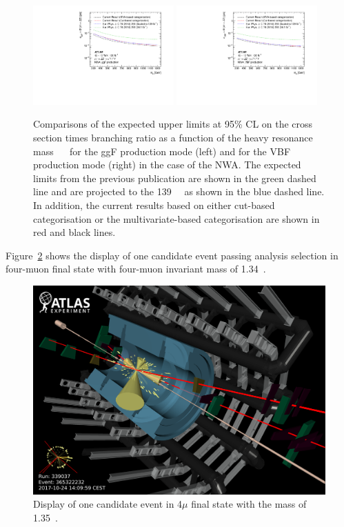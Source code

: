 \begin{figure}[h]
    \centering
    \includegraphics[width=0.48\textwidth]{figures/HMHZZ/results/4l_36vs139_ggF.pdf}
    \includegraphics[width=0.48\textwidth]{figures/HMHZZ/results/4l_36vs139_VBF.pdf}
    \caption{Comparisons of the expected upper limits at 95\% CL on the cross section times branching ratio as a
             function of the heavy resonance mass ~\mH~ for the ggF production mode (left) and for the VBF production mode
             (right) in the case of the NWA. The expected limits from the previous publication are shown in the green dashed
             line and are projected to the 139~\ifb~
             as shown in the blue dashed line. In addition, the current results based on either
             cut-based categorisation or the multivariate-based categorisation are shown in red and black lines.}
    \label{fig:comparison_limits}
\end{figure}

Figure~\ref{fig:4mu_eventdisplay} shows the display of one candidate event passing analysis selection in four-muon final state with four-muon invariant mass of 1.34~\tev.

\begin{figure}[h]
    \centering
    \includegraphics[width=1.0\textwidth]{figures/HMHZZ/results/display_run339037_evt365322232_2017-10-24T14-09-59.png}
    \caption{Display of one candidate event in 4$\mu$ final state with the mass of 1.35~\tev.}
    \label{fig:4mu_eventdisplay}
\end{figure}
